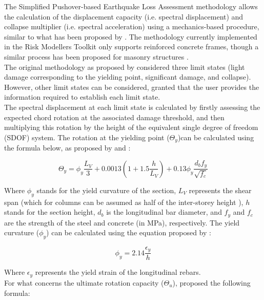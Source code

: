 The Simplified Pushover-based Earthquake Loss Assessment methodology \citep{BorziEtAl2008b} allows the calculation of the displacement capacity (i.e. spectral displacement) and collapse multiplier (i.e. spectral acceleration) using a mechanics-based procedure, similar to what has been proposed by \citet{CosenzaEtAl2005}. The methodology currently implemented in the Risk Modellers Toolkit only supports reinforced concrete frames, though a similar process has been proposed for masonry structures \citep{BorziEtAl2008a}.\\

The original methodology as proposed by \citet{BorziEtAl2008b} considered three limit states (light damage corresponding to the yielding point, significant damage, and collapse). However, other limit states can be considered, granted that the user provides the information required to establish each limit state.\\

The spectral displacement at each limit state is calculated by firstly assessing the expected chord rotation at the associated damage threshold, and then multiplying this rotation by the height of the equivalent single degree of freedom (SDOF) system. The rotation at the yielding point ($\Theta_y$)can be calculated using the formula below, as proposed by \citet{CosenzaEtAl2005} and \citet{PanagiotakosFardis2001}:

\begin{equation}
	\Theta_y = \phi_y\frac{L_V}{3}+0.0013\left(1 + 1.5\frac{h}{L_V}\right)+0.13\phi_y\frac{d_bf_y}{\sqrt{f_c}}
\end{equation}

Where $\phi_y$ stands for the yield curvature of the section, $L_V$ represents the shear span (which for columns can be assumed as half of the inter-storey height \citep{BorziEtAl2008b}), $h$ stands for the section height, $d_b$ is the longitudinal bar diameter, and $f_y$ and $f_c$ are the strength of the steel and concrete (in MPa), respectively. The yield curvature ($\phi_y$) can be calculated using the equation proposed by \cite{PriestleyEtAl2007}:

\begin{equation}
	\phi_y = 2.14\frac{\epsilon_y}{h}
\end{equation}

Where $\epsilon_y$ represents the yield strain of the longitudinal rebars.\\

For what concerns the ultimate rotation capacity ($\Theta_u$), \cite{PanagiotakosFardis2001} proposed the following formula:

